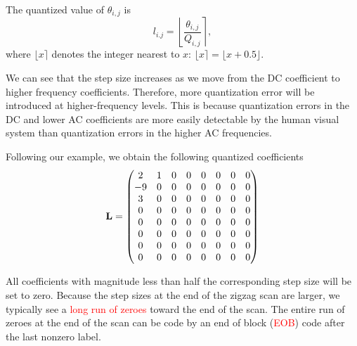 \documentclass[a4paper, 11pt, openany]{book}
\numberwithin{equation}{section}
\theoremstyle{plain}
\theoremstyle{definition}
\newcommand{\Important}[1]{\textcolor{red}{#1}}
\begin{document}
The quantized value of $\theta_{i,j}$ is
\[
    l_{i.j} = \left\lfloor \frac{ \theta_{i,j} }{ Q_{i,j} } \right\rceil,
\]
where $\lfloor x \rceil$ denotes the integer nearest to $x$: $\lfloor x \rceil = \lfloor x + 0.5 \rfloor$. 


We can see that the step size increases as we move from the DC coefficient to higher frequency coefficients. Therefore, more quantization error will be introduced at higher-frequency levels. This is because quantization errors in the DC and lower AC coefficients are more easily detectable by the human visual system than quantization errors in the higher AC frequencies.

Following our example, we obtain the following quantized coefficients
\[
    {\bf L} = \begin{pmatrix}
    2 & 1 & 0 & 0 & 0 & 0 & 0 & 0\\
    -9 & 0 & 0 & 0 & 0 & 0 & 0 & 0\\
    3 & 0 & 0 & 0 & 0 & 0 & 0 & 0\\
    0 & 0 & 0 & 0 & 0 & 0 & 0 & 0\\
    0 & 0 & 0 & 0 & 0 & 0 & 0 & 0\\
    0 & 0 & 0 & 0 & 0 & 0 & 0 & 0\\
    0 & 0 & 0 & 0 & 0 & 0 & 0 & 0\\
    0 & 0 & 0 & 0 & 0 & 0 & 0 & 0
    \end{pmatrix}
\]

All coefficients with magnitude less than half the corresponding step size will be set to zero. Because the step sizes at the end of the zigzag scan are larger, we typically see a \Important{long run of zeroes} toward the end of the scan. The entire run of zeroes at the end of the scan can be code by an end of block (\Important{EOB}) code after the last nonzero label.
\end{document}
